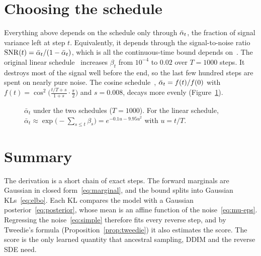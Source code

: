 \section{Choosing the schedule}\label{sec:schedule}
Everything above depends on the schedule only through $\bar\alpha_t$, the fraction of signal variance left at step $t$.
Equivalently, it depends through the signal-to-noise ratio $\mathrm{SNR}(t) = \bar\alpha_t / (1-\bar\alpha_t)$, which is all the continuous-time bound depends on~\cite{kingma2021}.
The original linear schedule~\cite{ho2020} increases $\beta_t$ from $10^{-4}$ to $0.02$ over $T = 1000$ steps.
It destroys most of the signal well before the end, so the last few hundred steps are spent on nearly pure noise.
The cosine schedule~\cite{nichol2021}, $\bar\alpha_t = f(t)/f(0)$ with $f(t) = \cos^2\!\big(\frac{t/T + s}{1 + s}\cdot\frac{\pi}{2}\big)$ and $s = 0.008$, decays more evenly (Figure~\ref{fig:schedule}).

\begin{figure}[t]
  \centering
  \caption{$\bar\alpha_t$ under the two schedules ($T = 1000$). For the linear schedule, $\bar\alpha_t \approx \exp\!\big(-\sum_{s \le t} \beta_s\big) = e^{-0.1u - 9.95u^2}$ with $u = t/T$.}\label{fig:schedule}
\end{figure}

\section{Summary}\label{sec:summary}
The derivation is a short chain of exact steps.
The forward marginals are Gaussian in closed form~\eqref{eq:marginal}, and the bound splits into Gaussian KLs~\eqref{eq:elbo}.
Each KL compares the model with a Gaussian posterior~\eqref{eq:posterior}, whose mean is an affine function of the noise~\eqref{eq:mu-eps}.
Regressing the noise~\eqref{eq:simple} therefore fits every reverse step, and by Tweedie's formula (Proposition~\ref{prop:tweedie}) it also estimates the score.
The score is the only learned quantity that ancestral sampling, DDIM and the reverse SDE need.

